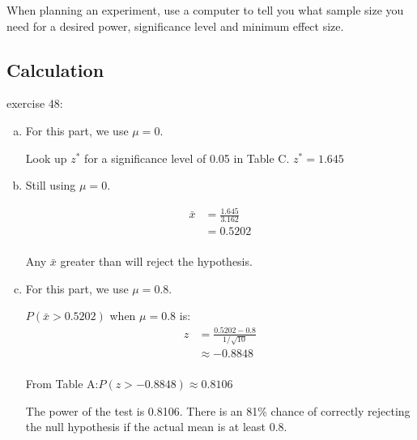 \documentclass[letterpaper, landscape]{exam}
\begin{document}
  When planning an experiment, use a computer to tell you what sample size you
  need for a desired power, significance level and minimum effect size.

  \pagebreak

  \subsection{Calculation} %
  
  exercise 48:

  \begin{enumerate}[(a)]
    \item 
      For this part, we use $\mu = 0$.

      Look up $z^*$ for a significance level of 0.05 in Table C. $z^* = 1.645$

    \item
      Still using $\mu = 0$.

      \begin{align*}
        \bar{x} & = \frac{1.645}{3.162} \\
                & = \boxed{ 0.5202 } \\
      \end{align*}

      Any $\bar{x}$ greater than  will reject the hypothesis.

    \item 
      For this part, we use $\mu = 0.8$.

      $P(\bar{x} > 0.5202)$ when $\mu = 0.8$ is:
      \begin{align*}
        z & = \frac{0.5202 - 0.8}{1/\sqrt{10}} \\
          & \approx -0.8848 \\
      \end{align*}

      From Table A:\@ $P(z > -0.8848) \approx \boxed{ 0.8106 }$

      The power of the test is 0.8106. There is an 81\% chance of correctly
      rejecting the null hypothesis if the actual mean is at least 0.8.

  \end{enumerate}

\end{document}

